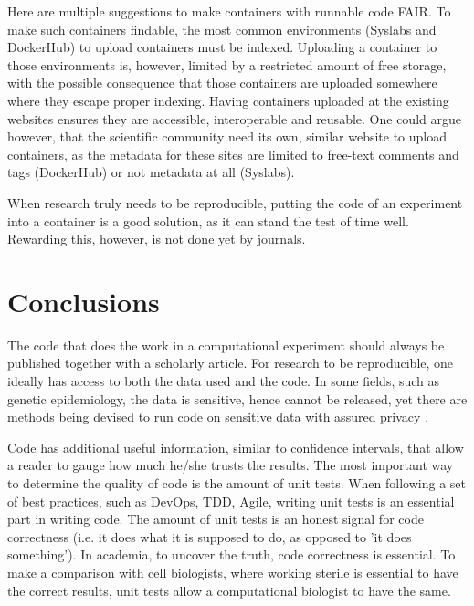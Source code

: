 
Here are multiple suggestions to make containers with runnable code FAIR.
To make such containers findable, the most common 
environments (Syslabs and DockerHub) to upload containers must be indexed.
Uploading a container to those environments is, however, limited by
a restricted amount of free storage, with the possible consequence that
those containers are uploaded somewhere where they escape proper indexing.
Having containers uploaded at the existing websites ensures they are
accessible, interoperable and reusable.
One could argue however, that the scientific community need its own,
similar website to upload containers, as the metadata for these
sites are limited to free-text comments and tags (DockerHub)
or not metadata at all (Syslabs).


When research truly needs to be reproducible, putting the code 
of an experiment into a container is a good solution, as it 
can stand the test of time well. Rewarding this, however, is not
done yet by journals.

\section{Conclusions}

The code that does the work in a computational experiment should
always be published together with a scholarly article.
For research to be reproducible, one ideally has access to
both the data used and the code.
In some fields, such as genetic epidemiology, the data is
sensitive, hence cannot be released,
yet there are methods being devised to run code on sensitive
data with assured privacy \cite{zhang2016review,azencott2018machine}.

Code has additional useful information, similar to confidence intervals,
that allow a reader to gauge how much he/she trusts the results.
The most important way to determine the quality of code
is the amount of unit tests.
When following a set of best practices, such as DevOps, TDD, Agile,
writing unit tests is an essential 
part in writing code.
The amount of unit tests is an honest signal 
for code correctness (i.e. it does what it is supposed to do, as opposed
to 'it does something').
In academia, to uncover the truth, code correctness is essential.
To make a comparison with cell biologists, where working
sterile is essential to have the correct results,
unit tests allow a computational biologist to have the same.

